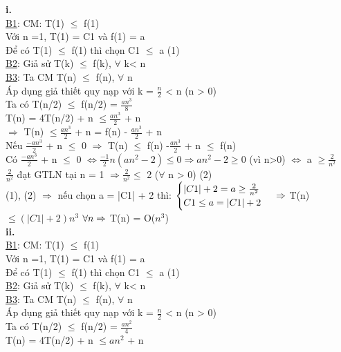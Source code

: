 \documentclass[10pt,a4paper]{article}
\begin{document}
\textbf{i.} \\
\underline{B1}: CM: T(1) $\leq$ f(1) \\
Với n =1, T(1) = C1 và f(1) = a \\
Để có T(1) $\leq$ f(1) thì chọn C1 $\leq$ a (1)\\
\underline{B2}: Giả sử T(k) $\leq$ f(k), $\forall$ k< n \\
\underline{B3}: Ta CM T(n) $\leq$ f(n), $\forall$ n \\
Áp dụng giả thiết quy nạp với k = $\frac{n}{2}$ < n (n > 0)\\
Ta có T(n/2) $\leq$ f(n/2) = $\frac{an^3}{8}$ \\
T(n) = 4T(n/2) + n $\leq \frac{an^3}{2}$ + n \\
$\Rightarrow$ T(n) $\leq \frac{an^3}{2}$ + n = f(n) - $\frac{an^3}{2}$ + n \\
Nếu $\frac{-an^3}{2}$ + n $\leq$ 0 $\Rightarrow$ T(n) $\leq$ f(n) -$\frac{an^3}{2}$ + n $\leq$ f(n) \\
Có $\frac{-an^3}{2}$ + n $\leq$ 0 $\Leftrightarrow \frac{-1}{2}n(an^2 -2) \leq 0 \Rightarrow an^2 -2 \geq 0$ (vì n>0) $\Leftrightarrow$ a $\geq \frac{2}{n^2}$  \\
$\frac{2}{n^2}$ đạt GTLN tại n = 1 $\Rightarrow \frac{2}{n^2} \leq$ 2 ($\forall$ n > 0) (2) \\
(1), (2) $\Rightarrow$ nếu chọn a = |C1| + 2 thì: 
$\begin{cases}
    |C1| + 2 = a \geq \frac{2}{n^2} \\
    C1 \leq a = |C1| + 2
\end{cases} \\
\Rightarrow$ T(n) $\leq (|C1| + 2) n^3 $ $\forall n \\
\Rightarrow$ T(n) = O($n^3$) \\
\textbf{ii.} \\
\underline{B1}: CM: T(1) $\leq$ f(1) \\
Với n =1, T(1) = C1 và f(1) = a \\
Để có T(1) $\leq$ f(1) thì chọn C1 $\leq$ a (1)\\
\underline{B2}: Giả sử T(k) $\leq$ f(k), $\forall$ k< n \\
\underline{B3}: Ta CM T(n) $\leq$ f(n), $\forall$ n \\
Áp dụng giả thiết quy nạp với k = $\frac{n}{2}$ < n (n > 0)\\
Ta có T(n/2) $\leq$ f(n/2) = $\frac{an^2}{4}$ \\
T(n) = 4T(n/2) + n $\leq an^2$ + n \\
\end{document}
